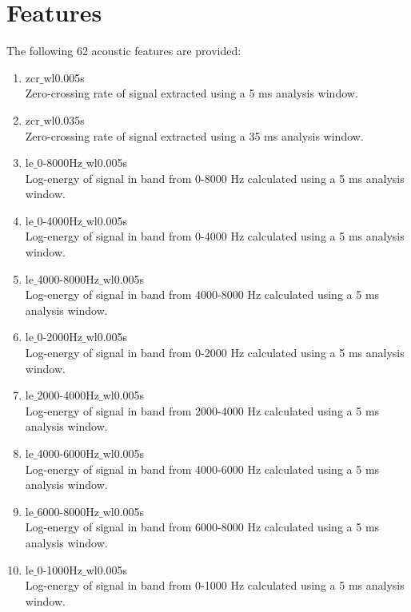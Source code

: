 \documentclass[12pt]{article}
\begin{document}
\section{Features}
The following 62 acoustic features are provided:
\begin{enumerate}
    \item zcr$\_$wl0.005s \\
      Zero-crossing rate of signal extracted using a 5 ms analysis window.

    \item zcr$\_$wl0.035s \\
      Zero-crossing rate of signal extracted using a 35 ms analysis window.

    \item le$\_$0-8000Hz$\_$wl0.005s \\
      Log-energy of signal in band from 0-8000 Hz calculated using a 5 ms analysis window.

    \item le$\_$0-4000Hz$\_$wl0.005s \\
      Log-energy of signal in band from 0-4000 Hz calculated using a 5 ms analysis window.

    \item le$\_$4000-8000Hz$\_$wl0.005s \\
      Log-energy of signal in band from 4000-8000 Hz calculated using a 5 ms analysis window.

    \item le$\_$0-2000Hz$\_$wl0.005s \\
      Log-energy of signal in band from 0-2000 Hz calculated using a 5 ms analysis window.

    \item le$\_$2000-4000Hz$\_$wl0.005s \\
      Log-energy of signal in band from 2000-4000 Hz calculated using a 5 ms analysis window.

    \item le$\_$4000-6000Hz$\_$wl0.005s \\
      Log-energy of signal in band from 4000-6000 Hz calculated using a 5 ms analysis window.

    \item le$\_$6000-8000Hz$\_$wl0.005s \\
      Log-energy of signal in band from 6000-8000 Hz calculated using a 5 ms analysis window.

    \item le$\_$0-1000Hz$\_$wl0.005s \\
      Log-energy of signal in band from 0-1000 Hz calculated using a 5 ms analysis window.


\end{enumerate}
\end{document}
